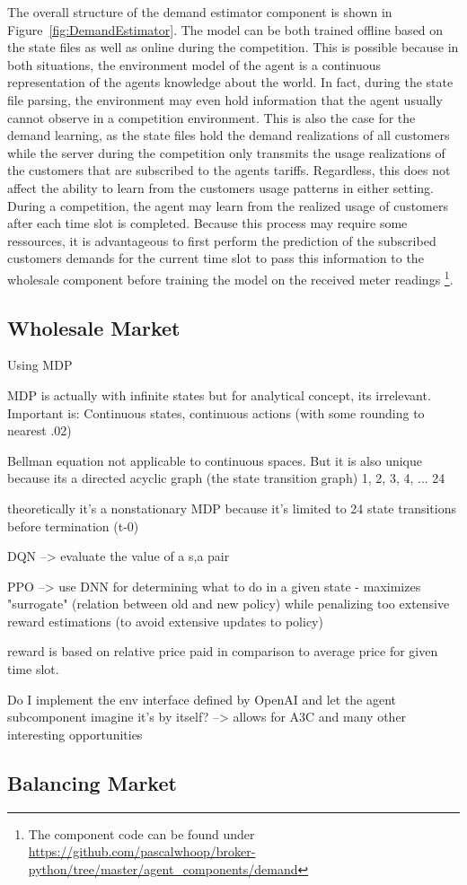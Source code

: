The overall structure of the demand estimator component is shown in Figure~\ref{fig:DemandEstimator}. The model can be
both trained offline based on the state files as well as online during the competition. This is possible because in both
situations, the environment model of the agent is a continuous representation of the agents knowledge about the world.
In fact, during the state file parsing, the environment may even hold information that the agent usually cannot observe
in a competition environment. This is also the case for the demand learning, as the state files hold the demand
realizations of all customers while the server during the competition only transmits the usage realizations of the
customers that are subscribed to the agents tariffs. Regardless, this does not affect the ability to learn from the
customers usage patterns in either setting. During a competition, the agent may learn from the realized usage of
customers after each time slot is completed. Because this process may require some ressources, it is advantageous to
first perform the prediction of the subscribed customers demands for the current time slot to pass this information to
the wholesale component before training the model on the received meter readings \footnote{The component code can be
found under \url{https://github.com/pascalwhoop/broker-python/tree/master/agent_components/demand}}.


\subsection{Wholesale Market}

Using \ac {MDP} 

\ac {MDP} is actually with infinite states but for analytical concept, its irrelevant. Important is: Continuous states,
continuous actions (with some rounding to nearest .02)

Bellman equation not applicable to continuous spaces. But it is also unique because its a directed acyclic graph (the
state transition graph) 1, 2, 3, 4, ... 24

theoretically it's a nonstationary \ac {MDP} because it's limited to 24 state transitions before termination (t-0)

DQN --> evaluate the value of a s,a pair

\ac {PPO} --> use DNN for determining what to do in a given state - maximizes "surrogate" (relation between old and new
policy) while penalizing too extensive reward estimations (to avoid extensive updates to policy)

reward is based on relative price paid in comparison to average price for given time slot. 

Do I implement the env interface defined by OpenAI and let the agent subcomponent imagine it's by itself? --> allows for
A3C and many other interesting opportunities

\subsection{Balancing Market}
